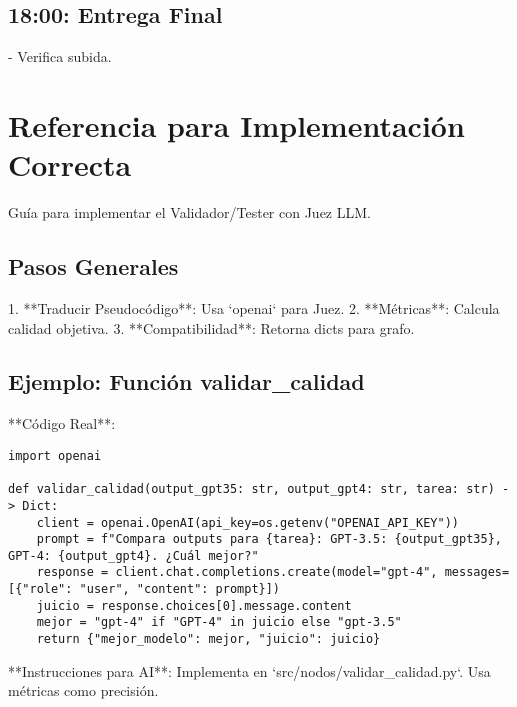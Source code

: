 \documentclass{article}
\begin{document}
\subsection{18:00: Entrega Final}
- Verifica subida.

\section{Referencia para Implementación Correcta}
Guía para implementar el Validador/Tester con Juez LLM.

\subsection{Pasos Generales}
1. **Traducir Pseudocódigo**: Usa `openai` para Juez.
2. **Métricas**: Calcula calidad objetiva.
3. **Compatibilidad**: Retorna dicts para grafo.

\subsection{Ejemplo: Función validar_calidad}
**Código Real**:
\begin{lstlisting}
import openai

def validar_calidad(output_gpt35: str, output_gpt4: str, tarea: str) -> Dict:
    client = openai.OpenAI(api_key=os.getenv("OPENAI_API_KEY"))
    prompt = f"Compara outputs para {tarea}: GPT-3.5: {output_gpt35}, GPT-4: {output_gpt4}. ¿Cuál mejor?"
    response = client.chat.completions.create(model="gpt-4", messages=[{"role": "user", "content": prompt}])
    juicio = response.choices[0].message.content
    mejor = "gpt-4" if "GPT-4" in juicio else "gpt-3.5"
    return {"mejor_modelo": mejor, "juicio": juicio}
\end{lstlisting}

**Instrucciones para AI**: Implementa en `src/nodos/validar_calidad.py`. Usa métricas como precisión.
\end{document}
